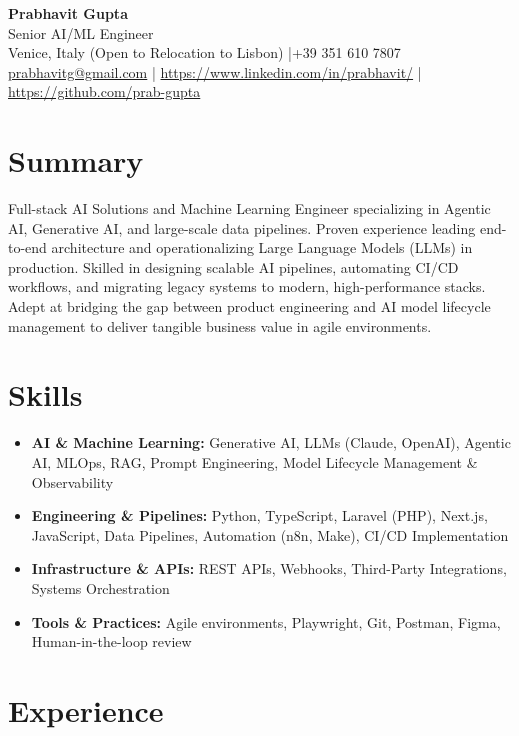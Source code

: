 \documentclass[a4paper,10pt]{article}
\begin{document}
\begin{center}
 {\Huge\bfseries Prabhavit Gupta}\\[5pt]
 {\large Senior AI/ML Engineer}\\[5pt]
 Venice, Italy (Open to Relocation to Lisbon) \quad |\quad +39 351 610 7807\\[2pt]
 \href{mailto:prabhavitg@gmail.com}{prabhavitg@gmail.com} \quad |\quad
 \href{https://www.linkedin.com/in/prabhavit/}{https://www.linkedin.com/in/prabhavit/} \quad |\quad
 \href{https://github.com/prab-gupta}{https://github.com/prab-gupta}
\end{center}

\vspace{10pt}

\section{Summary}
Full-stack AI Solutions and Machine Learning Engineer specializing in Agentic AI, Generative AI, and large-scale data pipelines. Proven experience leading end-to-end architecture and operationalizing Large Language Models (LLMs) in production. Skilled in designing scalable AI pipelines, automating CI/CD workflows, and migrating legacy systems to modern, high-performance stacks. Adept at bridging the gap between product engineering and AI model lifecycle management to deliver tangible business value in agile environments.

\section{Skills}
\begin{itemize}
 \item \textbf{AI \& Machine Learning:} Generative AI, LLMs (Claude, OpenAI), Agentic AI, MLOps, RAG, Prompt Engineering, Model Lifecycle Management \& Observability
 \item \textbf{Engineering \& Pipelines:} Python, TypeScript, Laravel (PHP), Next.js, JavaScript, Data Pipelines, Automation (n8n, Make), CI/CD Implementation
 \item \textbf{Infrastructure \& APIs:} REST APIs, Webhooks, Third-Party Integrations, Systems Orchestration
 \item \textbf{Tools \& Practices:} Agile environments, Playwright, Git, Postman, Figma, Human-in-the-loop review
\end{itemize}

\section{Experience}
\end{document}
